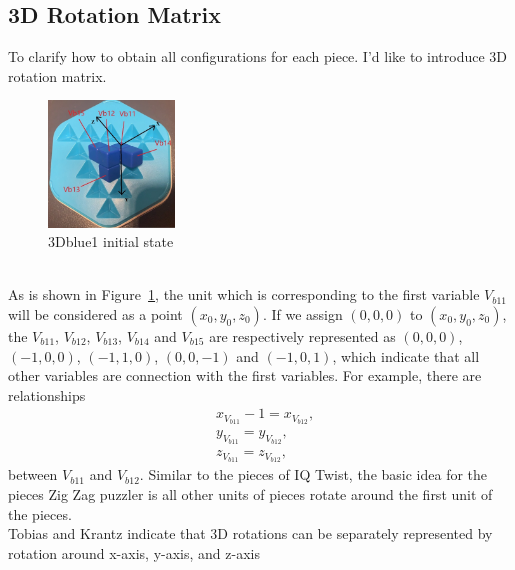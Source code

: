 \subsection{3D Rotation Matrix}
\label{section:3Drotationmatrix}
To clarify how to obtain all configurations for each piece.  I’d like to introduce 3D rotation matrix.
\begin{figure}[htbp]
\label{figure:3Dblue1}
\centering
\includegraphics[width=0.3\textwidth]{figs/3Drotateexplain.jpg}
\caption{3Dblue1 initial state}
\label{fig:3Dblue1explanation}
\end{figure}
\\As is shown in Figure~\ref{fig:3Dblue1explanation}, the unit which is corresponding to the first variable $V_{b11}$ will be considered as a point $(x_{0},y_{0},z_{0})$. If we assign $(0,0,0)$ to $(x_{0},y_{0},z_{0})$, the $V_{b11}$, $V_{b12}$, $V_{b13}$, $V_{b14}$ and $V_{b15}$ are respectively represented as $(0,0,0)$, $(-1,0,0)$, $(-1,1,0)$, $(0,0,-1)$ and $(-1,0,1)$, which indicate that all other variables are connection with the first variables. For example, there are relationships
\begin{equation}
\begin{aligned}
&x_{V_{b11}}-1=x_{V_{b12}},\\
&y_{V_{b11}}=y_{V_{b12}},\\
&z_{V_{b11}}=z_{V_{b12}},
\end{aligned}
\end{equation}
between $V_{b11}$ and $V_{b12}$.
Similar to the pieces of IQ Twist, the basic idea for the pieces Zig Zag puzzler is all other units of pieces rotate around the first unit of the pieces.
\\Tobias and Krantz \cite{r9} indicate that 3D rotations can be separately represented by rotation around x-axis, y-axis, and z-axis 
